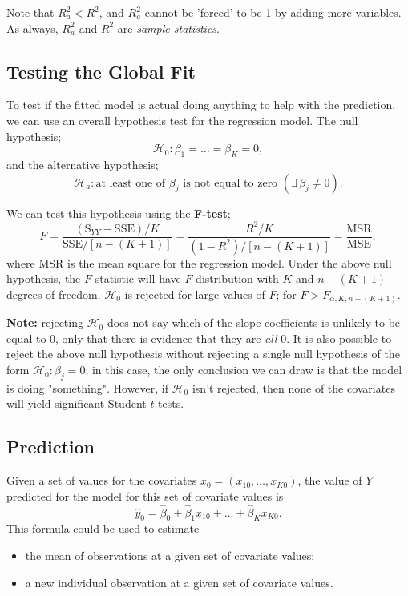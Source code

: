 \documentclass[12pt]{article}
\begin{document}
Note that $R_a^2 < R^2$, and $R_a^2$ cannot be 'forced' to be 1 by adding more variables. As always, $R_a^2$ and $R^2$ are \textit{sample statistics}.

\subsection{Testing the Global Fit}

To test if the fitted model is actual doing anything to help with the prediction, we can use an overall hypothesis test for the regression model. The null hypothesis; \[\mathcal{H}_0: \beta_1 = \dots = \beta_K = 0,\] and the alternative hypothesis; \[\mathcal{H}_a: \text{at least one of } \beta_j \text{ is not equal to zero } (\exists\, \beta_j \neq 0).\]

We can test this hypothesis using the \textbf{F-test}; \[F = \frac{(\text{S}_{YY} - \text{SSE})/K}{\text{SSE}/\left[n-(K+1)\right]} = \frac{R^2/K}{(1-R^2)/\left[n-(K+1)\right]} = \frac{\text{MSR}}{\text{MSE}},\] where MSR is the mean square for the regression model. Under the above null hypothesis, the $F$-statistic will have $F$ distribution with $K$ and $n-(K+1)$ degrees of freedom. $\mathcal{H}_0$ is rejected for large values of $F$; for $F > F_{\alpha, K, n-(K+1)}$.

\textbf{Note:} rejecting $\mathcal{H}_0$ does not say which of the slope coefficients is unlikely to be equal to 0, only that there is evidence that they are \textit{all} 0. It is also possible to reject the above null hypothesis without rejecting a single null hypothesis of the form $\mathcal{H}_0: \beta_j = 0$; in this case, the only conclusion we can draw is that the model is doing "something". However, if $\mathcal{H}_0$ isn't rejected, then none of the covariates will yield significant Student $t$-tests.

\subsection{Prediction}

Given a set of values for the covariates $x_0 = (x_{10}, \dots, x_{K0})$, the value of $Y$ predicted for the model for this set of covariate values is \[\hat{y}_0 = \hat{\beta}_0 + \hat{\beta}_1 x_{10} + \dots + \hat{\beta}_K x_{K0}.\] This formula could be used to estimate \begin{itemize}
    \item the mean of observations at a given set of covariate values;
    \item a new individual observation at a given set of covariate values.
\end{itemize}
\end{document}
